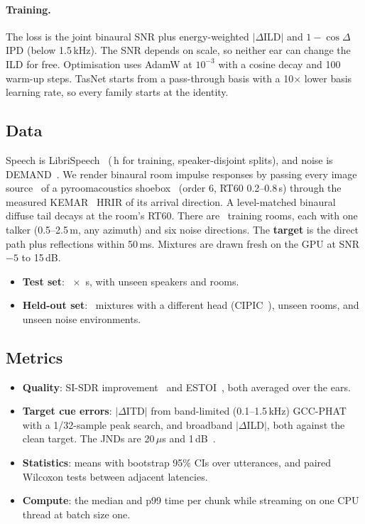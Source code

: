 \paragraph{Training.}
The loss is the joint binaural SNR plus energy-weighted $|\Delta$ILD$|$ and
$1-\cos\Delta$IPD (below 1.5\,kHz). The SNR depends on scale, so neither
ear can change the ILD for free. Optimisation uses AdamW at $10^{-3}$ with
a cosine decay and 100 warm-up steps. TasNet starts from a pass-through
basis with a 10$\times$ lower basis learning rate, so every family starts
at the identity.

\subsection{Data}
Speech is LibriSpeech~\cite{panayotov2015librispeech}
(\SpeechTrainHours\,h for training, speaker-disjoint splits), and noise is
DEMAND~\cite{thiemann2013demand}. We render binaural room impulse responses
by passing every image source~\cite{allen1979image} of a pyroomacoustics
shoebox~\cite{scheibler2018pyroomacoustics} (order 6, RT60 0.2--0.8\,s)
through the measured KEMAR~\cite{gardner1995kemar} HRIR of its arrival
direction. A level-matched binaural diffuse tail decays at the room's
RT60. There are \RoomsTrain\ training rooms, each with one talker
(0.5--2.5\,m, any azimuth) and six noise directions. The \textbf{target}
is the direct path plus reflections within 50\,ms. Mixtures are drawn
fresh on the GPU at SNR $-5$ to 15\,dB.
\begin{itemize}
\item \textbf{Test set}: \NumTest\ $\times$ \TestSeconds\,s, with unseen
speakers and rooms.
\item \textbf{Held-out set}: \NumHeldout\ mixtures with a different head
(CIPIC~\cite{algazi2001cipic}), unseen rooms, and unseen noise
environments.
\end{itemize}

\subsection{Metrics}
\begin{itemize}
\item \textbf{Quality}: SI-SDR improvement~\cite{leroux2019sdr} and
ESTOI~\cite{jensen2016estoi}, both averaged over the ears.
\item \textbf{Target cue errors}: $|\Delta$ITD$|$ from band-limited
(0.1--1.5\,kHz) GCC-PHAT with a 1/32-sample peak search, and broadband
$|\Delta$ILD$|$, both against the clean target. The JNDs are 20\,$\mu$s
and 1\,dB~\cite{klumpp1956itd,mills1960ild}.
\item \textbf{Statistics}: means with bootstrap 95\% CIs over utterances,
and paired Wilcoxon tests between adjacent latencies.
\item \textbf{Compute}: the median and p99 time per chunk while streaming
on one CPU thread at batch size one.
\end{itemize}

